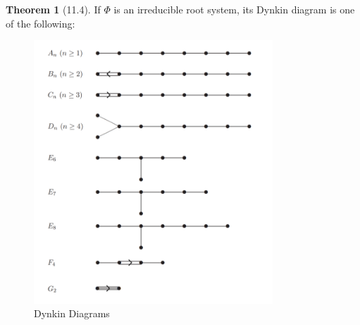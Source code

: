 \documentclass{article}
\theoremstyle{definition}
\newtheorem{theorem}{Theorem}[section]
\begin{document}
\begin{theorem}
    [11.4]

    If \(\Phi\) is an irreducible root system, its Dynkin diagram is one of the following:

    \begin{figure}[H]
        \centering
        \includegraphics[width=0.8\textwidth]{img/dynkin}
        \caption{Dynkin Diagrams}
        \label{fig:dynkin}
    \end{figure}
\end{theorem}
\end{document}
